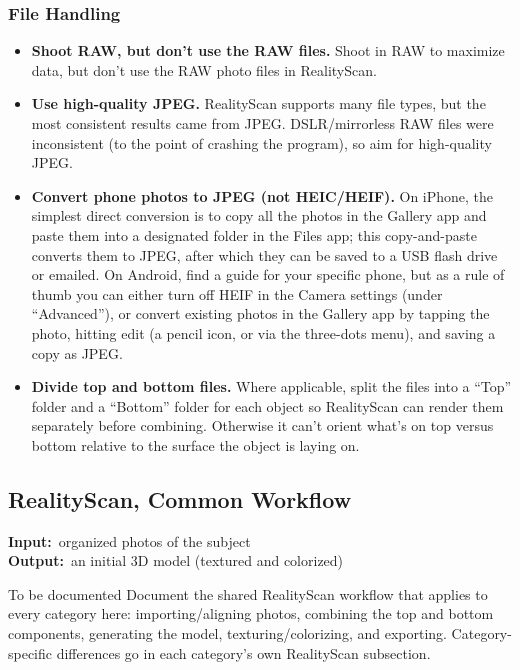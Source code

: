 \documentclass[11pt]{article}
\newcommand{\inout}[2]{%
    \begin{stageio}%
    \textbf{Input:}~#1\\[2pt]%
    \textbf{Output:}~#2%
    \end{stageio}%
}
\begin{document}
\subsubsection{File Handling}
\begin{itemize}[leftmargin=1.4em]
  \item \textbf{Shoot RAW, but don't use the RAW files.} Shoot in RAW to maximize data, but don't use the RAW photo files in RealityScan.
  \item \textbf{Use high-quality JPEG.} RealityScan supports many file types, but the most consistent results came from JPEG. DSLR/mirrorless RAW files were inconsistent (to the point of crashing the program), so aim for high-quality JPEG.
  \item \textbf{Convert phone photos to JPEG (not HEIC/HEIF).} On iPhone, the simplest direct conversion is to copy all the photos in the Gallery app and paste them into a designated folder in the Files app; this copy-and-paste converts them to JPEG, after which they can be saved to a USB flash drive or emailed. On Android, find a guide for your specific phone, but as a rule of thumb you can either turn off HEIF in the Camera settings (under ``Advanced''), or convert existing photos in the Gallery app by tapping the photo, hitting edit (a pencil icon, or via the three-dots menu), and saving a copy as JPEG.
  \item \textbf{Divide top and bottom files.} Where applicable, split the files into a ``Top'' folder and a ``Bottom'' folder for each object so RealityScan can render them separately before combining. Otherwise it can't orient what's on top versus bottom relative to the surface the object is laying on.
\end{itemize}

\subsection{RealityScan, Common Workflow}
\label{sec:common-rs}
\inout{organized photos of the subject}{an initial 3D model (textured and colorized)}
\begin{todobox}{To be documented}
Document the shared RealityScan workflow that applies to every category here: importing/aligning photos, combining the top and bottom components, generating the model, texturing/colorizing, and exporting. Category-specific differences go in each category's own RealityScan subsection.
\end{todobox}
\end{document}
